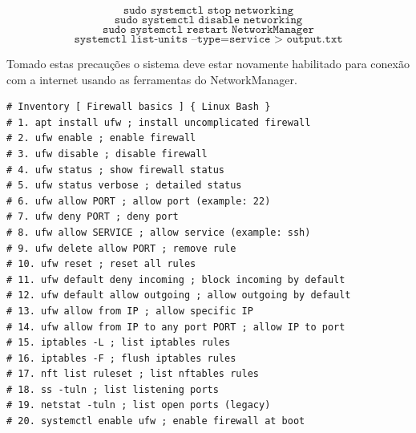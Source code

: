 \documentclass[12pt,a4paper]{article}
\begin{document}
$$ \texttt{sudo systemctl stop networking} $$
$$ \texttt{sudo systemctl disable networking} $$
$$ \texttt{sudo systemctl restart NetworkManager} $$
$$ \texttt{systemctl list-units --type=service > output.txt} $$

Tomado estas precauções o sistema deve estar novamente habilitado para conexão com a internet usando as ferramentas do NetworkManager. 

\begin{lstlisting}
# Inventory [ Firewall basics ] { Linux Bash }
# 1. apt install ufw ; install uncomplicated firewall
# 2. ufw enable ; enable firewall
# 3. ufw disable ; disable firewall
# 4. ufw status ; show firewall status
# 5. ufw status verbose ; detailed status
# 6. ufw allow PORT ; allow port (example: 22)
# 7. ufw deny PORT ; deny port
# 8. ufw allow SERVICE ; allow service (example: ssh)
# 9. ufw delete allow PORT ; remove rule
# 10. ufw reset ; reset all rules
# 11. ufw default deny incoming ; block incoming by default
# 12. ufw default allow outgoing ; allow outgoing by default
# 13. ufw allow from IP ; allow specific IP
# 14. ufw allow from IP to any port PORT ; allow IP to port
# 15. iptables -L ; list iptables rules
# 16. iptables -F ; flush iptables rules
# 17. nft list ruleset ; list nftables rules
# 18. ss -tuln ; list listening ports
# 19. netstat -tuln ; list open ports (legacy)
# 20. systemctl enable ufw ; enable firewall at boot
\end{lstlisting}
\end{document}
